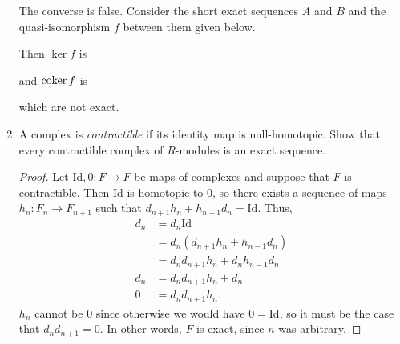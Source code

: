 \documentclass[11pt,oneside,english]{amsart}
\theoremstyle{definition}
\newcommand{\MB}[1]{\mathbb{#1}}
\newcommand{\coker}{\text{coker\,}}
\begin{document}
\begin{enumerate}[leftmargin=*]
The converse is false. Consider the short exact sequences $A$ and $B$ and the quasi-isomorphism $f$ between them given below.
\begin{center}
\end{center}
Then $\ker f$ is 
\begin{center}
\end{center}
and $\coker f$ is
\begin{center}
\end{center}
which are not exact.


\pagebreak

\item A complex is \textit{contractible} if its identity map is null-homotopic. Show that every contractible complex of $R$-modules is an exact sequence.

\begin{proof}
Let $\text{Id},0:F\to F$ be maps of complexes and suppose that $F$ is contractible. Then $\text{Id}$ is homotopic to 0, so there exists a sequence of maps $h_n:F_n\to F_{n+1}$ such that $d_{n+1}h_n+h_{n-1}d_n=\text{Id}$. Thus,
\begin{align*}
d_n&=d_n\text{Id}\\[2mm]
&=d_n(d_{n+1}h_n+h_{n-1}d_n)\\[2mm]
&=d_nd_{n+1}h_n+d_nh_{n-1}d_n\\[2mm]
d_n&=d_nd_{n+1}h_n+d_n\\[2mm]
0&=d_nd_{n+1}h_n.
\end{align*}
$h_n$ cannot be 0 since otherwise we would have $0=\text{Id}$, so it must be the case that $d_nd_{n+1}=0$. In other words, $F$ is exact, since $n$ was arbitrary.
\end{proof}


\end{enumerate}
\end{document}

